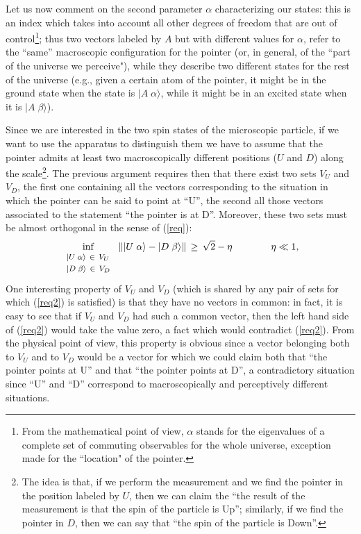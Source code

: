 \documentclass[12pt]{article}
\begin{document}
Let us now comment on the second parameter $\alpha$ characterizing
our states: this is an index which takes into account all other
degrees of freedom that are out of control\footnote{From the
mathematical point of view, $\alpha$ stands for the eigenvalues of
a  complete set of commuting observables for the whole universe,
exception made for the ``location" of the pointer.}; thus two vectors
labeled by $A$ but with different values for $\alpha$, refer to
the ``same'' macroscopic configuration for the pointer (or, in
general, of the ``part of the universe we perceive"), while they
describe two different states for the rest of the universe (e.g.,
given a certain atom of the pointer, it might be in the ground
state when the state is $|A\; \alpha\rangle$, while it might be in
an excited state when it is $|A\;\beta\rangle$).

Since we are interested in the two spin states of the microscopic
particle, if we want to use the apparatus to distinguish them we
have to assume that the pointer admits at least two
macroscopically different positions ($U$ and $D$) along the
scale\footnote{The idea is that, if we perform the measurement and
we find the pointer in the position labeled by $U$, then we can
claim the ``the result of the measurement is that the spin of the
particle is Up''; similarly, if we find the pointer in $D$, then
we can say that ``the spin of the particle is Down''.}. The
previous argument requires then that there exist two sets $V_{U}$
and $V_{D}$, the first one containing all the vectors
corresponding to the situation in which the pointer can be said to
point at ``U'', the second all those vectors associated to the
statement ``the pointer is at D''. Moreover, these two sets must
be almost orthogonal in the sense of (\ref{req}):
\begin{equation} \label{req2}
\inf_{\begin{array}{l}
\makebox{\footnotesize $|U\;\alpha\rangle \,\in\, V_{U}$} \\
\makebox{\footnotesize $|D\;\beta\rangle \,\in\, V_{D}$}
\end{array}}\, \| |U\;\alpha\rangle -
|D\;\beta\rangle \|\, \geq\, \sqrt{2} - \eta \qquad\qquad \eta \ll
1,
\end{equation}
One interesting property of $V_{U}$ and $V_{D}$ (which is shared
by any pair  of sets for which (\ref{req2}) is satisfied) is that
they have no vectors in common: in fact, it is easy to see that if
$V_{U}$ and $V_{D}$ had such a common vector, then the left hand
side of (\ref{req2}) would take the value zero, a fact which would
contradict (\ref{req2}). From the physical point of view, this
property is obvious since a vector belonging both to $V_{U}$ and
to $V_{D}$ would be a vector for which we could claim both that
``the pointer points at U'' and that ``the pointer points at D'',
a contradictory situation since ``U'' and ``D'' correspond to
macroscopically and perceptively different situations.
\end{document}
